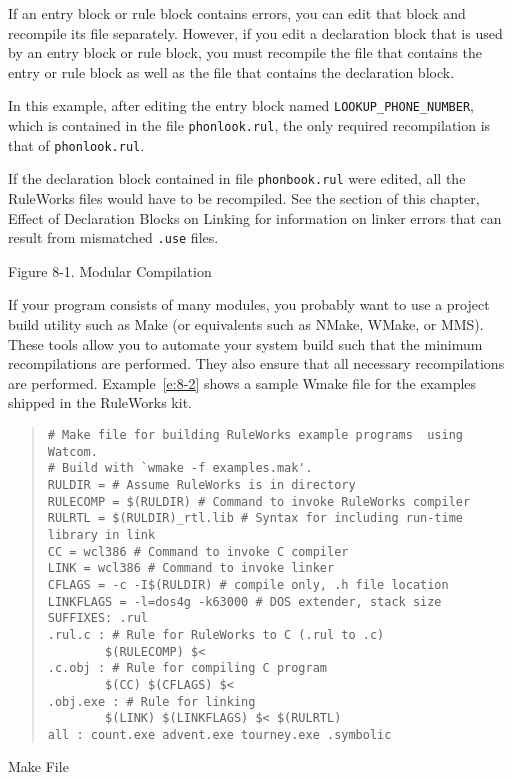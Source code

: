 If an entry block or rule block contains errors, you can edit that
block and recompile its file separately.  However, if you edit a
declaration block that is used by an entry block or rule block, you
must recompile the file that contains the entry or rule block as well
as the file that contains the declaration block.

In this example, after editing the entry block named
\verb|LOOKUP_PHONE_NUMBER|, which is contained in the file
\verb|phonlook.rul|, the only required recompilation is that of
\verb|phonlook.rul|.

If the declaration block contained in file \verb|phonbook.rul| were
edited, all the RuleWorks files would have to be recompiled. See the
section of this chapter, Effect of Declaration Blocks on Linking for
information on linker errors that can result from mismatched
\verb|.use| files.

Figure 8-1. Modular Compilation

If your program consists of many modules, you probably want to use a
project build utility such as Make (or equivalents such as NMake,
WMake, or MMS). These tools allow you to automate your system build
such that the minimum recompilations are performed. They also ensure
that all necessary recompilations are performed. Example~\ref{e:8-2}
shows a sample Wmake file for the examples shipped in the RuleWorks
kit.

\begin{example}[h]
\begin{quote}
\begin{verbatim}
# Make file for building RuleWorks example programs  using Watcom.
# Build with `wmake -f examples.mak'.
RULDIR = # Assume RuleWorks is in directory
RULECOMP = $(RULDIR) # Command to invoke RuleWorks compiler
RULRTL = $(RULDIR)_rtl.lib # Syntax for including run-time library in link
CC = wcl386 # Command to invoke C compiler
LINK = wcl386 # Command to invoke linker
CFLAGS = -c -I$(RULDIR) # compile only, .h file location
LINKFLAGS = -l=dos4g -k63000 # DOS extender, stack size
SUFFIXES: .rul
.rul.c : # Rule for RuleWorks to C (.rul to .c)
        $(RULECOMP) $<
.c.obj : # Rule for compiling C program
        $(CC) $(CFLAGS) $<
.obj.exe : # Rule for linking
        $(LINK) $(LINKFLAGS) $< $(RULRTL)
all : count.exe advent.exe tourney.exe .symbolic
\end{verbatim}
\end{quote}
\caption{Make File}
\label{e:8-2}
\end{example}

